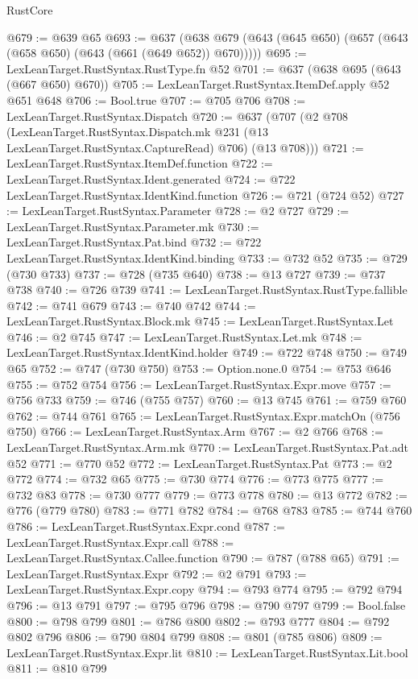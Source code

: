 \begin{lexlean}{RustCore}
\begin{coremodule}
@679 := @639 @65
@693 := @637 (@638 @679 (@643 (@645 @650) (@657 (@643 (@658 @650) (@643 (@661 (@649 @652)) @670)))))
@695 := LexLeanTarget.RustSyntax.RustType.fn @52
@701 := @637 (@638 @695 (@643 (@667 @650) @670))
@705 := LexLeanTarget.RustSyntax.ItemDef.apply @52 @651 @648
@706 := Bool.true
@707 := @705 @706
@708 := LexLeanTarget.RustSyntax.Dispatch
@720 := @637
    (@707
      (@2
        @708
        (LexLeanTarget.RustSyntax.Dispatch.mk @231 (@13 LexLeanTarget.RustSyntax.CaptureRead) @706)
        (@13 @708)))
@721 := LexLeanTarget.RustSyntax.ItemDef.function
@722 := LexLeanTarget.RustSyntax.Ident.generated
@724 := @722 LexLeanTarget.RustSyntax.IdentKind.function
@726 := @721 (@724 @52)
@727 := LexLeanTarget.RustSyntax.Parameter
@728 := @2 @727
@729 := LexLeanTarget.RustSyntax.Parameter.mk
@730 := LexLeanTarget.RustSyntax.Pat.bind
@732 := @722 LexLeanTarget.RustSyntax.IdentKind.binding
@733 := @732 @52
@735 := @729 (@730 @733)
@737 := @728 (@735 @640)
@738 := @13 @727
@739 := @737 @738
@740 := @726 @739
@741 := LexLeanTarget.RustSyntax.RustType.fallible
@742 := @741 @679
@743 := @740 @742
@744 := LexLeanTarget.RustSyntax.Block.mk
@745 := LexLeanTarget.RustSyntax.Let
@746 := @2 @745
@747 := LexLeanTarget.RustSyntax.Let.mk
@748 := LexLeanTarget.RustSyntax.IdentKind.holder
@749 := @722 @748
@750 := @749 @65
@752 := @747 (@730 @750)
@753 := Option.none.{0}
@754 := @753 @646
@755 := @752 @754
@756 := LexLeanTarget.RustSyntax.Expr.move
@757 := @756 @733
@759 := @746 (@755 @757)
@760 := @13 @745
@761 := @759 @760
@762 := @744 @761
@765 := LexLeanTarget.RustSyntax.Expr.matchOn (@756 @750)
@766 := LexLeanTarget.RustSyntax.Arm
@767 := @2 @766
@768 := LexLeanTarget.RustSyntax.Arm.mk
@770 := LexLeanTarget.RustSyntax.Pat.adt @52
@771 := @770 @52
@772 := LexLeanTarget.RustSyntax.Pat
@773 := @2 @772
@774 := @732 @65
@775 := @730 @774
@776 := @773 @775
@777 := @732 @83
@778 := @730 @777
@779 := @773 @778
@780 := @13 @772
@782 := @776 (@779 @780)
@783 := @771 @782
@784 := @768 @783
@785 := @744 @760
@786 := LexLeanTarget.RustSyntax.Expr.cond
@787 := LexLeanTarget.RustSyntax.Expr.call
@788 := LexLeanTarget.RustSyntax.Callee.function
@790 := @787 (@788 @65)
@791 := LexLeanTarget.RustSyntax.Expr
@792 := @2 @791
@793 := LexLeanTarget.RustSyntax.Expr.copy
@794 := @793 @774
@795 := @792 @794
@796 := @13 @791
@797 := @795 @796
@798 := @790 @797
@799 := Bool.false
@800 := @798 @799
@801 := @786 @800
@802 := @793 @777
@804 := @792 @802 @796
@806 := @790 @804 @799
@808 := @801 (@785 @806)
@809 := LexLeanTarget.RustSyntax.Expr.lit
@810 := LexLeanTarget.RustSyntax.Lit.bool
@811 := @810 @799

\end{coremodule}
\end{lexlean}
